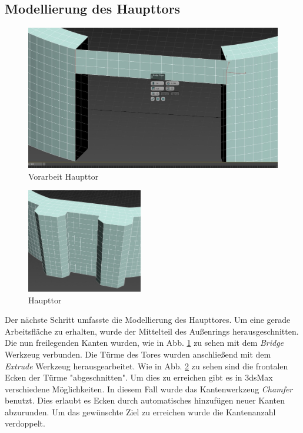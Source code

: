 \newpage
\subsection{Modellierung des Haupttors}

\begin{figure}[h]
	\centering
	\includegraphics[width=0.95 \linewidth]{Abbildungen/3dsMax/Haupttor}
	\caption{Vorarbeit Haupttor}
	\label{fig:Haupttor}
\end{figure}

\begin{figure}
	\begin{center}
		\includegraphics[width=0.45\textwidth]{Abbildungen/3dsMax/Haupttor2}
	\end{center}
	\caption{Haupttor}
	\label{fig:Haupttor2}
\end{figure}



Der nächste Schritt umfasste die Modellierung des Haupttores. Um eine gerade Arbeitsfläche zu erhalten, wurde der Mittelteil des Außenrings herausgeschnitten. Die nun freilegenden Kanten wurden, wie in Abb. \ref{fig:Haupttor} zu sehen mit dem \textit{Bridge} Werkzeug verbunden. Die Türme des Tores wurden anschließend mit dem \textit{Extrude} Werkzeug herausgearbeitet. Wie in Abb. \ref{fig:Haupttor2} zu sehen sind die frontalen Ecken der Türme "abgeschnitten". Um dies zu erreichen gibt es in 3dsMax verschiedene Möglichkeiten. In diesem Fall wurde das Kantenwerkzeug \textit{Chamfer} benutzt. Dies erlaubt es Ecken durch automatisches hinzufügen neuer Kanten abzurunden. Um das gewünschte Ziel zu erreichen wurde die Kantenanzahl verdoppelt.

